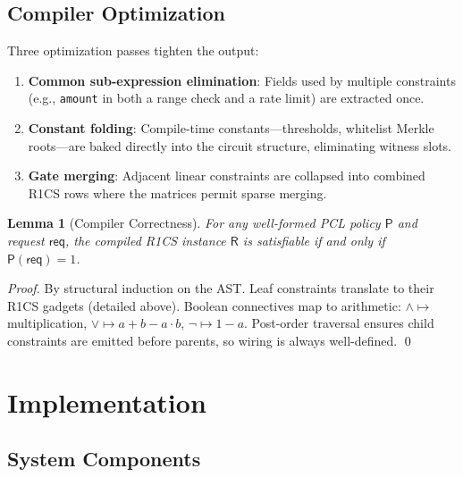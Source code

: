 \documentclass[10pt,conference]{IEEEtran}
\newtheorem{lemma}[theorem]{Lemma}
\begin{document}
\subsection{Compiler Optimization}

Three optimization passes tighten the output:

\begin{enumerate}
    \item \textbf{Common sub-expression elimination}: Fields used by multiple constraints (e.g., \texttt{amount} in both a range check and a rate limit) are extracted once.
    \item \textbf{Constant folding}: Compile-time constants---thresholds, whitelist Merkle roots---are baked directly into the circuit structure, eliminating witness slots.
    \item \textbf{Gate merging}: Adjacent linear constraints are collapsed into combined R1CS rows where the matrices permit sparse merging.
\end{enumerate}

\begin{lemma}[Compiler Correctness]
\label{lem:compiler_correctness}
For any well-formed PCL policy $\mathsf{P}$ and request $\mathsf{req}$, the compiled R1CS instance $\mathsf{R}$ is satisfiable if and only if $\mathsf{P}(\mathsf{req}) = 1$.
\end{lemma}

\begin{proof}
By structural induction on the AST. Leaf constraints translate to their R1CS gadgets (detailed above). Boolean connectives map to arithmetic: $\land \mapsto$ multiplication, $\lor \mapsto a + b - a \cdot b$, $\neg \mapsto 1 - a$. Post-order traversal ensures child constraints are emitted before parents, so wiring is always well-defined. \qed
\end{proof}

\section{Implementation}
\label{sec:implementation}

\subsection{System Components}
\end{document}
